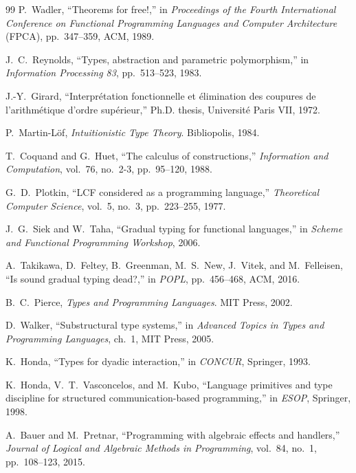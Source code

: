 \documentclass[11pt]{article}
\begin{document}
\begin{thebibliography}{99}
P.~Wadler, ``Theorems for free!,'' in \textit{Proceedings of the Fourth
International Conference on Functional Programming Languages and Computer
Architecture} (FPCA), pp.~347--359, ACM, 1989.

J.~C.~Reynolds, ``Types, abstraction and parametric polymorphism,'' in
\textit{Information Processing 83}, pp.~513--523, 1983.

J.-Y.~Girard, ``Interpr\'{e}tation fonctionnelle et \'{e}limination des
coupures de l'arithm\'{e}tique d'ordre sup\'{e}rieur,'' Ph.D. thesis,
Universit\'{e} Paris VII, 1972.

P.~Martin-L\"{o}f, \textit{Intuitionistic Type Theory}. Bibliopolis, 1984.

T.~Coquand and G.~Huet, ``The calculus of constructions,'' \textit{Information
and Computation}, vol.~76, no.~2-3, pp.~95--120, 1988.

G.~D.~Plotkin, ``LCF considered as a programming language,'' \textit{Theoretical
Computer Science}, vol.~5, no.~3, pp.~223--255, 1977.

J.~G.~Siek and W.~Taha, ``Gradual typing for functional languages,'' in
\textit{Scheme and Functional Programming Workshop}, 2006.

A.~Takikawa, D.~Feltey, B.~Greenman, M.~S.~New, J.~Vitek, and
M.~Felleisen, ``Is sound gradual typing dead?,'' in \textit{POPL},
pp.~456--468, ACM, 2016.

B.~C.~Pierce, \textit{Types and Programming Languages}. MIT Press, 2002.

D.~Walker, ``Substructural type systems,'' in \textit{Advanced Topics in
Types and Programming Languages}, ch.~1, MIT Press, 2005.

K.~Honda, ``Types for dyadic interaction,'' in \textit{CONCUR}, Springer, 1993.

K.~Honda, V.~T.~Vasconcelos, and M.~Kubo, ``Language primitives and type
discipline for structured communication-based programming,'' in
\textit{ESOP}, Springer, 1998.

A.~Bauer and M.~Pretnar, ``Programming with algebraic effects and handlers,''
\textit{Journal of Logical and Algebraic Methods in Programming}, vol.~84,
no.~1, pp.~108--123, 2015.


\end{thebibliography}
\end{document}

